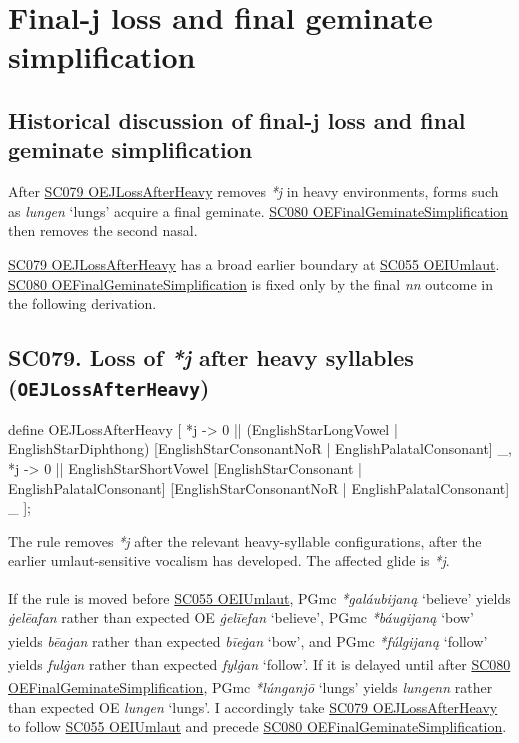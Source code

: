 \documentclass[
  british,
  a4paper,
  openany]{book}
\providecommand{\Pred}[1]{\textsuperscript{\dag}\emph{#1}}
\providecommand{\Recon}[1]{\emph{*#1}}
{\catcode`→=\active \global\def→{\ensuremath{\rightarrow}}}
\providecommand{\texorpdfstring}[2]{#1}
\providecommand{\Pred}[1]{\textsuperscript{\dag}\emph{#1}}
\providecommand{\Recon}[1]{\emph{*#1}}
{\catcode`→=\active \global\def→{\ensuremath{\rightarrow}}}
\begin{document}
\newpage

\section{Final-j loss and final geminate
simplification}\label{final-j-loss-and-final-geminate-simplification}

\subsection{Historical discussion of final-j loss and final geminate
simplification}\label{historical-discussion-of-final-j-loss-and-final-geminate-simplification}

After \hyperref[rule-OEJLossAfterHeavy]{SC079 OEJLossAfterHeavy} removes
\emph{*j} in heavy environments, forms such as \emph{lungen} `lungs'
acquire a final geminate.
\hyperref[rule-OEFinalGeminateSimplification]{SC080
OEFinalGeminateSimplification} then removes the second nasal.

\hyperref[rule-OEJLossAfterHeavy]{SC079 OEJLossAfterHeavy} has a broad
earlier boundary at \hyperref[rule-OEIUmlaut]{SC055 OEIUmlaut}.
\hyperref[rule-OEFinalGeminateSimplification]{SC080
OEFinalGeminateSimplification} is fixed only by the final \emph{nn}
outcome in the following derivation.

\subsection{\texorpdfstring{SC079. Loss of \emph{*j} after heavy
syllables
(\texttt{OEJLossAfterHeavy})}{SC079. Loss of  after heavy syllables (OEJLossAfterHeavy)}}\label{rule-OEJLossAfterHeavy}

\begin{ReaderFacingFoma}
define OEJLossAfterHeavy [
    {*j} -> 0 || (EnglishStarLongVowel | EnglishStarDiphthong) [EnglishStarConsonantNoR | EnglishPalatalConsonant] _,
    {*j} -> 0 || EnglishStarShortVowel [EnglishStarConsonant | EnglishPalatalConsonant] [EnglishStarConsonantNoR | EnglishPalatalConsonant] _
];
\end{ReaderFacingFoma}

The rule removes \emph{*j} after the relevant heavy-syllable
configurations, after the earlier umlaut-sensitive vocalism has
developed. The affected glide is \emph{*j}.

If the rule is moved before \hyperref[rule-OEIUmlaut]{SC055 OEIUmlaut},
PGmc \Recon{galáubijaną} `believe' yields \Pred{ġelēafan} rather than
expected OE \emph{ġelīefan} `believe', PGmc \Recon{báugijaną} `bow'
yields \Pred{bēaġan} rather than expected \emph{bīeġan} `bow', and PGmc
\Recon{fúlgijaną} `follow' yields \Pred{fulġan} rather than expected
\emph{fylġan} `follow'. If it is delayed until after
\hyperref[rule-OEFinalGeminateSimplification]{SC080
OEFinalGeminateSimplification}, PGmc \Recon{lúnganjō} `lungs' yields
\Pred{lungenn} rather than expected OE \emph{lungen} `lungs'. I
accordingly take \hyperref[rule-OEJLossAfterHeavy]{SC079
OEJLossAfterHeavy} to follow \hyperref[rule-OEIUmlaut]{SC055 OEIUmlaut}
and precede \hyperref[rule-OEFinalGeminateSimplification]{SC080
OEFinalGeminateSimplification}.
\end{document}
